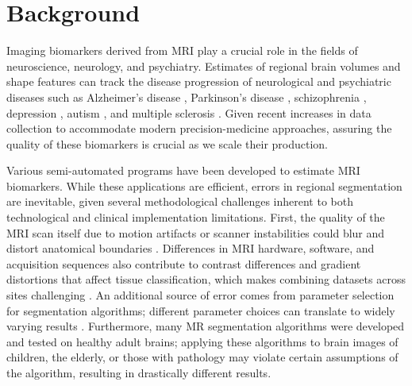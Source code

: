 \section{Background}


Imaging biomarkers derived from MRI play a crucial role in the fields of neuroscience, neurology, and psychiatry. Estimates of regional brain volumes and shape features can track the disease progression of  neurological and psychiatric diseases such as Alzheimer's disease \cite{18632739,Vemuri_2010}, Parkinson's disease \cite{Silvia_Mangia_2013}, schizophrenia \cite{shenton2001review}, depression \cite{meisenzahl2011structural}, autism \cite{brambilla2003brain}, and multiple sclerosis \cite{Filippi_1995}. Given recent increases in data collection to accommodate modern precision-medicine approaches, assuring the quality of these biomarkers is crucial as we scale their production. 

Various semi-automated programs have been developed to estimate MRI biomarkers. While these applications are efficient, errors in regional segmentation are inevitable, given several methodological challenges inherent to both technological and clinical implementation limitations. First, the quality of the MRI scan itself due to motion artifacts or scanner instabilities could blur and distort anatomical boundaries \cite{Blumenthal_2002,Pardoe_2016,Reuter_2015,Savalia_2016}. Differences in MRI hardware, software, and acquisition sequences also contribute to contrast differences and gradient distortions that affect tissue classification, which makes combining datasets across sites challenging \cite{keshavan2016power}. An additional source of error comes from parameter selection for segmentation algorithms; different parameter choices can translate to widely varying results \cite{Han_2006}. Furthermore, many MR segmentation algorithms were developed and tested on healthy adult brains; applying these algorithms to brain images of children, the elderly, or those with pathology may violate certain assumptions of the algorithm, resulting in drastically different results. 

